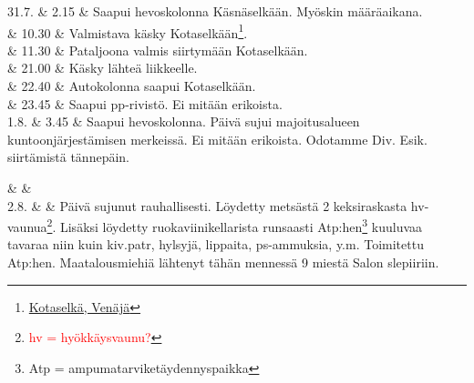 \documentclass[11pt,a5paper,oneside]{book}
\begin{document}
\taulustop


31.7. & 2.15 & Saapui hevoskolonna Käsnäselkään. Myöskin määräaikana. \newline \\

& 10.30 & Valmistava käsky Kotaselkään\footnote{\href{https://www.google.fi/maps/place/61\%C2\%B031'09.9\%22N+32\%C2\%B033'31.8\%22E/}{Kotaselkä, Venäjä}}. \\

& 11.30 & Pataljoona valmis siirtymään Kotaselkään. \newline \\

& 21.00 & Käsky lähteä liikkeelle. \\

& 22.40 & Autokolonna saapui Kotaselkään. \\

& 23.45 & Saapui pp-rivistö. \newline Ei mitään erikoista. \newline\newline\newline\newline\newline\newline \\

1.8. & 3.45 & Saapui hevoskolonna. \newline Päivä sujui majoitusalueen kuntoonjärjestämisen merkeissä. Ei mitään erikoista. Odotamme Div. Esik. siirtämistä tännepäin. \\
\newpage

& & \newline\newline\newline \\

2.8. & & Päivä sujunut rauhallisesti. \newline Löydetty metsästä 2 keksiraskasta hv-vaunua\footnote{\textcolor{red}{hv = hyökkäysvaunu?}}. Lisäksi löydetty ruokaviinikellarista runsaasti Atp:hen\footnote{Atp = ampumatarviketäydennyspaikka} kuuluvaa tavaraa niin kuin kiv.patr, hylsyjä, lippaita, ps-ammuksia, y.m. Toimitettu Atp:hen. \newline Maatalousmiehiä lähtenyt tähän mennessä 9 miestä Salon slepiiriin. \\
\end{document}
